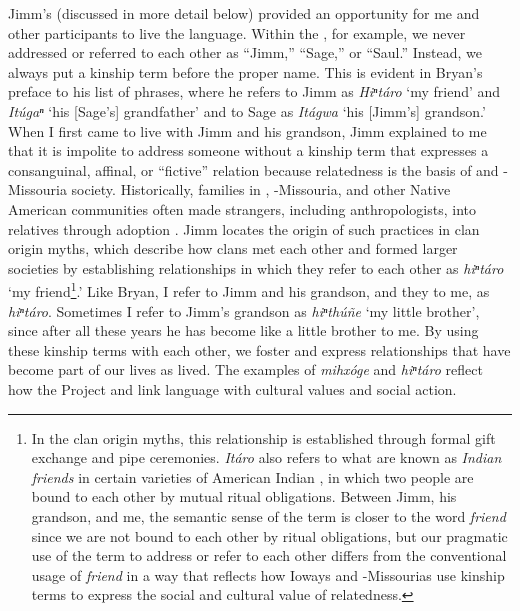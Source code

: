 \documentclass[output=paper]{LSP/langsci}
\begin{document}
Jimm's  (discussed in more detail below) provided an opportunity for me and other participants to live the language. Within the , for example, we never addressed or referred to each other as ``Jimm,'' ``Sage,'' or ``Saul.'' Instead, we always put a kinship term before the proper name. This is evident in Bryan's preface to his list of  phrases, where he refers to Jimm as \emph{Hiⁿtáro} `my friend' and \emph{Itúgaⁿ} `his [Sage's] grandfather' and to Sage as \emph{Itágwa} `his [Jimm's] grandson.' When I first came to live with Jimm and his grandson, Jimm explained to me that it is impolite to address someone without a kinship term that expresses a consanguinal, affinal, or ``fictive'' relation because relatedness is the basis of  and -Missouria society. Historically, families in , -Missouria, and other Native American communities often made strangers, including anthropologists, into relatives through adoption \citep[see e.g.][]{Kan2001}. Jimm locates the origin of such practices in clan origin myths, which describe how clans met each other and formed larger societies by establishing relationships in which they refer to each other as \emph{hiⁿtáro} `my friend\footnote{In the clan origin myths, this relationship is established through formal gift exchange and pipe ceremonies. \emph{Itáro} also refers to what are known as \emph{Indian friends} in certain varieties of American Indian , in which two people are bound to each other by mutual ritual obligations. Between Jimm, his grandson, and me, the semantic sense of the term is closer to the  word \emph{friend} since we are not bound to each other by ritual obligations, but our pragmatic use of the term to address or refer to each other differs from the conventional  usage of \emph{friend} in a way that reflects how Ioways and -Missourias use kinship terms to express the social and cultural value of relatedness.}.' Like Bryan, I refer to Jimm and his grandson, and they to me, as \emph{hiⁿtáro}. Sometimes I refer to Jimm's grandson as \emph{hiⁿthúñe} `my little brother', since after all these years he has become like a little brother to me. By using these kinship terms with each other, we foster and express relationships that have become part of our lives as lived. The examples of \emph{mihxóge} and \emph{hiⁿtáro} reflect how the Project and  link  language with cultural values and social action.
\end{document}
